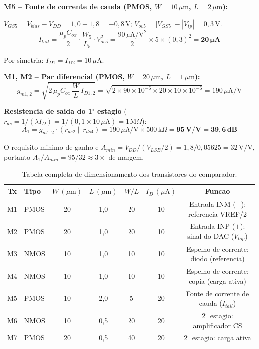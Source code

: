 \documentclass[12pt, a4paper]{article}
\begin{document}
\textbf{M5 -- Fonte de corrente de cauda (PMOS, $W=10\,\mu\text{m}$, $L=2\,\mu\text{m}$):}

$V_{GS5} = V_{bias} - V_{DD} = 1{,}0 - 1{,}8 = -0{,}8\,\text{V}$;
$V_{ov5} = |V_{GS5}| - |V_{tp}| = 0{,}3\,\text{V}$.
\begin{equation}
  I_{tail} = \frac{\mu_p C_{ox}}{2} \cdot \frac{W_5}{L_5} \cdot V_{ov5}^2
  = \frac{90\,\mu\text{A/V}^2}{2} \times 5 \times (0{,}3)^2 = \mathbf{20\,\mu\text{A}}
  \label{eq:itail}
\end{equation}

Por simetria: $I_{D1} = I_{D2} = 10\,\mu\text{A}$.

\textbf{M1, M2 -- Par diferencial (PMOS, $W=20\,\mu\text{m}$, $L=1\,\mu\text{m}$):}
\begin{equation}
  g_{m1,2} = \sqrt{2\,\mu_p C_{ox}\,\frac{W}{L}\,I_{D1,2}}
  = \sqrt{2 \times 90\times10^{-6} \times 20 \times 10\times10^{-6}} = 190\,\mu\text{A/V}
  \label{eq:gm}
\end{equation}

\textbf{Resistencia de saida do 1$^\circ$ estagio} ($r_{ds} = 1/(\lambda I_D) = 1/(0{,}1 \times 10\,\mu\text{A}) = 1\,\text{M}\Omega$):
\begin{equation}
  A_1 = g_{m1,2} \cdot (r_{ds2} \| r_{ds4}) = 190\,\mu\text{A/V} \times 500\,\text{k}\Omega
  = \mathbf{95\,\text{V/V} = 39{,}6\,\text{dB}}
  \label{eq:gain}
\end{equation}

O requisito minimo de ganho e $A_{min} = V_{DD}/(V_{LSB}/2) = 1{,}8/0{,}05625 = 32\,\text{V/V}$,
portanto $A_1 / A_{min} = 95/32 \approx 3\times$ de margem.

\begin{table}[H]
\centering
\caption{Tabela completa de dimensionamento dos transistores do comparador.}
\label{tab:comp_transistors}
\begin{tabular}{clccccc}
\toprule
\textbf{Tx} & \textbf{Tipo} & $W\,(\mu\text{m})$ & $L\,(\mu\text{m})$ & $W/L$ & $I_D\,(\mu\text{A})$ & \textbf{Funcao}\\
\midrule
M1 & PMOS & 20 & 1,0 & 20 & 10 & Entrada INM ($-$): referencia VREF/2 \\
M2 & PMOS & 20 & 1,0 & 20 & 10 & Entrada INP ($+$): sinal do DAC ($V_{top}$) \\
M3 & NMOS & 10 & 1,0 & 10 & 10 & Espelho de corrente: diodo (referencia) \\
M4 & NMOS & 10 & 1,0 & 10 & 10 & Espelho de corrente: copia (carga ativa) \\
M5 & PMOS & 10 & 2,0 &  5 & 20 & Fonte de corrente de cauda ($I_{tail}$) \\
M6 & NMOS & 10 & 0,5 & 20 & 20 & 2$^\circ$ estagio: amplificador CS \\
M7 & PMOS & 20 & 0,5 & 40 & 20 & 2$^\circ$ estagio: carga ativa \\
\bottomrule
\end{tabular}
\end{table}
\end{document}
